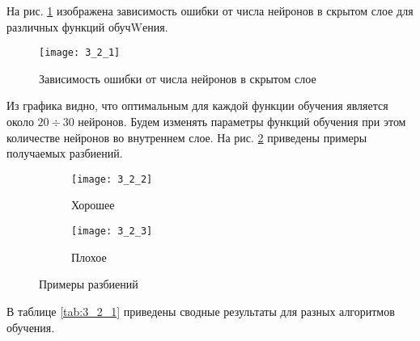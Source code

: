 На рис. \ref{fig:3_2_1} изображена зависимость ошибки от числа нейронов в скрытом слое для различных функций обучWения.
\begin{figure}[H]
\begin{center}
	\texttt{[image: 3\_2\_1]}
	\caption{Зависимость ошибки от числа нейронов в скрытом слое}
	\label{fig:3_2_1}
\end{center}
\end{figure}
Из графика видно, что оптимальным для каждой функции обучения является около $20 \div 30$ нейронов. Будем изменять параметры функций обучения при этом количестве нейронов во внутреннем слое. На рис. \ref{fig:3_2} приведены примеры получаемых разбиений. 
\begin{figure}[H]
\begin{center}
	\begin{subfigure}[b]{0.49\textwidth}
		\texttt{[image: 3\_2\_2]}
		\caption{Хорошее}
	\end{subfigure}
	\begin{subfigure}[b]{0.49\textwidth}
		\texttt{[image: 3\_2\_3]}
		\caption{Плохое}
	\end{subfigure}
	\caption{Примеры разбиений}
	\label{fig:3_2}
\end{center}
\end{figure}
В таблице \ref{tab:3_2_1} приведены сводные результаты для разных алгоритмов обучения.
